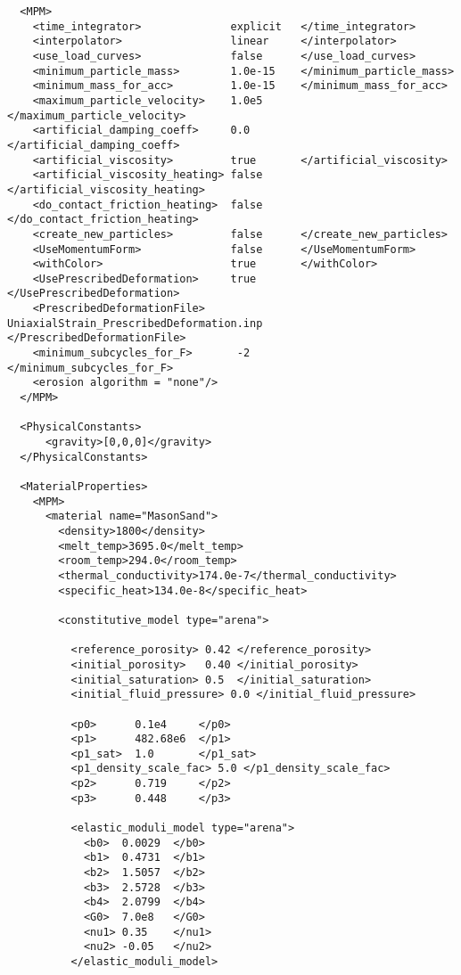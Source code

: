 \begin{lstlisting}
  <MPM>
    <time_integrator>              explicit   </time_integrator>
    <interpolator>                 linear     </interpolator>
    <use_load_curves>              false      </use_load_curves>
    <minimum_particle_mass>        1.0e-15    </minimum_particle_mass>
    <minimum_mass_for_acc>         1.0e-15    </minimum_mass_for_acc>
    <maximum_particle_velocity>    1.0e5      </maximum_particle_velocity>
    <artificial_damping_coeff>     0.0        </artificial_damping_coeff>
    <artificial_viscosity>         true       </artificial_viscosity>
    <artificial_viscosity_heating> false      </artificial_viscosity_heating>
    <do_contact_friction_heating>  false      </do_contact_friction_heating>
    <create_new_particles>         false      </create_new_particles>
    <UseMomentumForm>              false      </UseMomentumForm>
    <withColor>                    true       </withColor>
    <UsePrescribedDeformation>     true       </UsePrescribedDeformation>
    <PrescribedDeformationFile>    UniaxialStrain_PrescribedDeformation.inp   </PrescribedDeformationFile>
    <minimum_subcycles_for_F>       -2        </minimum_subcycles_for_F>
    <erosion algorithm = "none"/>
  </MPM>

  <PhysicalConstants>
      <gravity>[0,0,0]</gravity>
  </PhysicalConstants>

  <MaterialProperties>
    <MPM>
      <material name="MasonSand">
        <density>1800</density>
        <melt_temp>3695.0</melt_temp>
        <room_temp>294.0</room_temp>
        <thermal_conductivity>174.0e-7</thermal_conductivity>
        <specific_heat>134.0e-8</specific_heat>

        <constitutive_model type="arena">

          <reference_porosity> 0.42 </reference_porosity>
          <initial_porosity>   0.40 </initial_porosity>
          <initial_saturation> 0.5  </initial_saturation>
          <initial_fluid_pressure> 0.0 </initial_fluid_pressure>

          <p0>      0.1e4     </p0>
          <p1>      482.68e6  </p1>
          <p1_sat>  1.0       </p1_sat>
          <p1_density_scale_fac> 5.0 </p1_density_scale_fac>
          <p2>      0.719     </p2>
          <p3>      0.448     </p3>

          <elastic_moduli_model type="arena">
            <b0>  0.0029  </b0>
            <b1>  0.4731  </b1>
            <b2>  1.5057  </b2>
            <b3>  2.5728  </b3>
            <b4>  2.0799  </b4>
            <G0>  7.0e8   </G0>
            <nu1> 0.35    </nu1>
            <nu2> -0.05   </nu2>
          </elastic_moduli_model>


\end{lstlisting}
